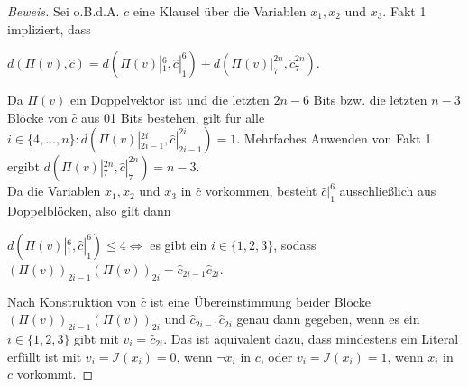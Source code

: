 \documentclass[11pt]{article}
\theoremstyle{break}
\theoremstyle{norm}
\begin{document}
\begin{proof}[Beweis]
Sei o.B.d.A. $c$ eine Klausel über die Variablen $x_1, x_2$ und $x_3$. Fakt 1 impliziert, dass
\begin{center}
    $d(\Pi(v),\hat{c}) = d(\Pi(v)|_1^6, \hat{c}|_1^6) + d(\Pi(v)|_7^{2n}, \hat{c}_7^{2n}) $.
\end{center}
Da $\Pi(v)$ ein Doppelvektor ist und die letzten $2n-6$ Bits bzw. die letzten $n-3$ Blöcke von $\hat{c}$ aus 01 Bits bestehen, gilt für alle $i\in\{4,\ldots,n \}: d(\Pi(v)|_{2i-1}^{2i}, \hat{c}|_{2i-1}^{2i})=1$. Mehrfaches Anwenden von Fakt 1 ergibt $d(\Pi(v)|_{7}^{2n}, \hat{c}|_{7}^{2n})=n-3$.\\
Da die Variablen $x_1, x_2$ und $x_3$ in $\hat{c}$ vorkommen, besteht $\hat{c}|_1^6$ ausschließlich aus Dop\-pel\-blöck\-en, also gilt dann
\begin{center}
     $d(\Pi(v)|_1^6, \hat{c}|_1^6)\leq 4 \Leftrightarrow$ es gibt ein $i\in\{1,2,3\}$, sodass $(\Pi(v))_{2i-1}(\Pi(v))_{2i} = \hat{c}_{2i-1}\hat{c}_{2i}$.
\end{center}
Nach Konstruktion von $\hat{c}$ ist eine Übereinstimmung beider Blöcke $(\Pi(v))_{2i-1}(\Pi(v))_{2i}$ und $\hat{c}_{2i-1}\hat{c}_{2i}$ genau dann gegeben, wenn es ein $i\in\{1,2,3\}$ gibt mit $v_i=\hat{c}_{2i}$. Das ist äquivalent dazu, dass mindestens ein Literal erfüllt ist mit $v_i = \mathcal{I}(x_i)=0$, wenn $\neg x_i$ in $c$, oder  $v_i = \mathcal{I}(x_i)=1$, wenn $x_i$ in $c$ vorkommt.
\end{proof}
\end{document}

